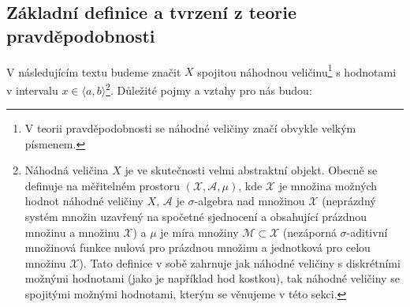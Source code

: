 \documentclass[a4paper,11pt,twoside]{article}
\theoremstyle{red}
\theoremstyle{green}
\begin{document}
    \subsection{Základní definice a tvrzení z teorie pravděpodobnosti}
    \label{sec:Pravdepodobnost}
        V následujícím textu budeme značit $X$ spojitou náhodnou veličinu\footnote{
            V teorii pravděpodobnosti se náhodné veličiny značí obvykle velkým písmenem.
        } s hodnotami v intervalu $x\in\langle a,b\rangle$\footnote{
            Náhodná veličina $X$ je ve skutečnosti velmi abstraktní objekt.
            Obecně se definuje na měřitelném prostoru $(\mathcal{X},\mathcal{A},\mu)$, kde $\mathcal{X}$ je množina možných hodnot náhodné veličiny $X$, $\mathcal{A}$ je $\sigma$-algebra nad množinou $\mathcal{X}$ (neprázdný systém množin uzavřený na spočetné sjednocení a obsahující prázdnou množinu a množinu $\mathcal{X}$) a $\mu$ je míra množiny $\mathcal{M}\subset\mathcal{X}$ (nezáporná $\sigma$-aditivní množinová funkce nulová pro prázdnou množinu a jednotková pro celou množinu $\mathcal{X}$).
            Tato definice v sobě zahrnuje jak náhodné veličiny s diskrétními možnými hodnotami (jako je například hod kostkou), tak náhodné veličiny se spojitými možnými hodnotami, kterým se věnujeme v této sekci.
        }.
        Důležité pojmy a vztahy pro nás budou:
\end{document}
